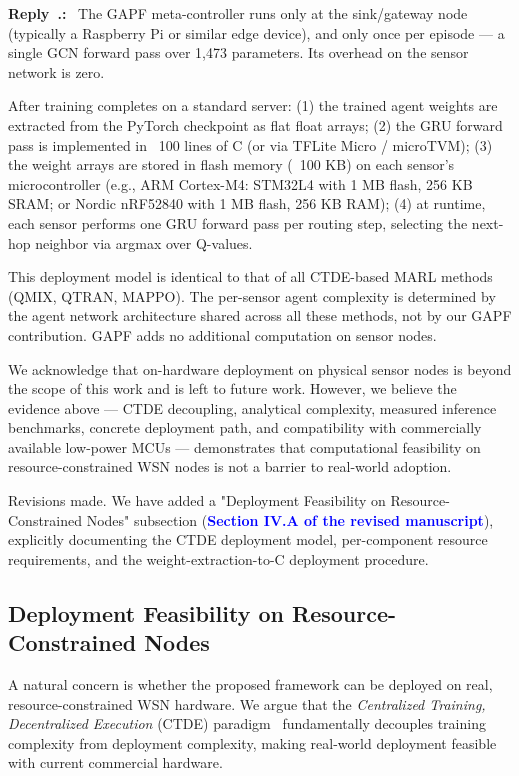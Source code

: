 \documentclass[11pt]{article}
\newcounter{reviewer}
\newcounter{point}[reviewer]
\newcounter{replyctr}[reviewer]
\renewcommand{\thereplyctr}{\thereviewer.\arabic{replyctr}}
\newenvironment{reply}
  {\refstepcounter{replyctr}%
   \addtocounter{replyctr}{-1}%
   \medskip\noindent
   \begin{sf}\textbf{Reply~\thereplyctr:}\ }
  {\addtocounter{replyctr}{1}%
   \medskip\end{sf}}
\begin{document}
\begin{refsection}
\begin{mdframed}[style=Resp]
\begin{reply}
The GAPF meta-controller runs only at the sink/gateway node (typically a Raspberry Pi or similar edge device), and only once per episode — a single GCN forward pass over 1,473 parameters. Its overhead on the sensor network is zero.

After training completes on a standard server: (1) the trained agent weights are extracted from the PyTorch checkpoint as flat float arrays; (2) the GRU forward pass is implemented in ~100 lines of C (or via TFLite Micro / microTVM); (3) the weight arrays are stored in flash memory (~100 KB) on each sensor's microcontroller (e.g., ARM Cortex-M4: STM32L4 with 1 MB flash, 256 KB SRAM; or Nordic nRF52840 with 1 MB flash, 256 KB RAM); (4) at runtime, each sensor performs one GRU forward pass per routing step, selecting the next-hop neighbor via argmax over Q-values.

This deployment model is identical to that of all CTDE-based MARL methods (QMIX, QTRAN, MAPPO). The per-sensor agent complexity is determined by the agent network architecture shared across all these methods, not by our GAPF contribution. GAPF adds no additional computation on sensor nodes.

We acknowledge that on-hardware deployment on physical sensor nodes is beyond the scope of this work and is left to future work. However, we believe the evidence above — CTDE decoupling, analytical complexity, measured inference benchmarks, concrete deployment path, and compatibility with commercially available low-power MCUs — demonstrates that computational feasibility on resource-constrained WSN nodes is not a barrier to real-world adoption.

Revisions made. We have added a "Deployment Feasibility on Resource-Constrained Nodes" subsection (\textbf{\textcolor{blue}{Section IV.A of the revised manuscript}}), explicitly documenting the CTDE deployment model, per-component resource requirements, and the weight-extraction-to-C deployment procedure.

\subsection{Deployment Feasibility on Resource-Constrained Nodes}
\label{sec:deployment_feasibility}

A natural concern is whether the proposed framework can be deployed on real,
resource-constrained WSN hardware. We argue that the \emph{Centralized Training,
Decentralized Execution} (CTDE) paradigm~\cite{kraemer2016multi,lowe2017multi}
fundamentally decouples training complexity from deployment complexity, making
real-world deployment feasible with current commercial hardware.


\end{reply}
\end{mdframed}
\end{refsection}
\end{document}
